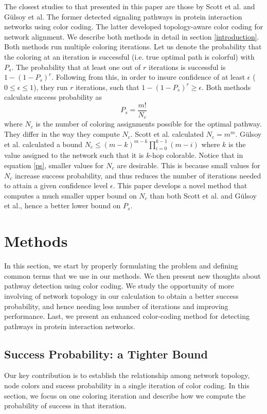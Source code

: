 \documentclass{ws-procs11x85}
\begin{document}
The closest studies to that presented in this paper are those by Scott et
al.\cite{scott} and G{\"u}lsoy et al\cite{gulsoy}. The former detected signaling
pathways in protein interaction networks using color coding. The latter
developed topology-aware color coding for network alignment. We describe both
methods in detail in section \ref{introduction}. Both methods run multiple 
coloring iterations. Let us denote the probability that the coloring at an
iteration is successful (i.e. true optimal path is colorful) with $P_s$. The
probability that at least one out of $r$ iterations is successful is $1 - (1 -
P_s)^r$. Following from this, in order to insure confidence of at least
$\epsilon$ ($0 \leq \epsilon \leq 1$), they run $r$ iterations, such that $1 -
(1 - P_s)^r \geq \epsilon$. Both methods calculate success probability as
\begin{equation}
P_s = \frac{m!}{N_c}
\label{ps}
\end{equation}
where $N_c$ is the number of coloring assignments possible for the optimal
pathway. They differ in the way they compute $N_c$. Scott et al.\cite{scott}
calculated $N_c = m^m$. G{\"u}lsoy et al.\cite{gulsoy} calculated a bound $N_c
\leq (m - k)^{m - k} \prod_{i=0}^{k-1} (m - i)$ where $k$ is the value assigned
to the network such that it is $k$-hop colorable. Notice that in equation
\ref{ps}, smaller values for $N_c$ are desirable. This is because small values
for $N_c$ increase success probability, and thus reduces the number of
iterations needed to attain a given confidence level $\epsilon$. This paper
develops a novel method that computes a much smaller upper bound on $N_c$ than
both Scott et al. and G{\"u}lsoy et al., hence a better lower bound on $P_s$.

\section{Methods}
In this section, we start by properly formulating the problem and defining
common terms that we use in our methods. We then present new thoughts about
pathway detection using color coding. We study the opportunity of more involving
of network topology in our calculation to obtain a better success probability,
and hence needing less number of iterations and improving performance. Last, we
present an enhanced color-coding method for detecting pathways in protein
interaction networks.

\subsection{Success Probability: a Tighter Bound}
Our key contribution is to establish the relationship among network topology,
node colors and sucess probability in a single iteration of color coding. In
this section, we focus on one coloring iteration and describe how we compute the
probability of success in that iteration.
\end{document}
